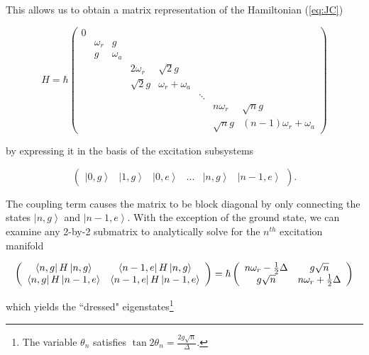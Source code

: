 \documentclass[11 pt, oneside]{book} %
\newcommand{\ket}[1]{\left| #1 \right>} %
\newcommand{\matrixel}[3]{\left< #1 \vphantom{#2#3} \right|
 #2 \left| #3 \vphantom{#1#2} \right>} %
\begin{document}
This allows us to obtain a matrix representation of the Hamiltonian (\ref{eq:JC}) 

\begin{equation}\label{eq:Matrix}
H =  \hbar\left(\begin{array}{cccccccc}
0 \\
& \omega_r 	& g \\
& g    		& \omega_a \\
&&&2\omega_r	 & \sqrt{2}g \\
&&&\sqrt{2}g 		& \omega_r + \omega_a\\
&&&&&\ddots\\
&&&&&&n\omega_r & \sqrt{n}g\\
&&&&&&\sqrt{n}g    & (n-1)\omega_r+\omega_a
\end{array} \right)
\end{equation}

by expressing it in the basis of the excitation subsystems

\begin{equation}
\left(\begin{array}{cccccc} \ket{0,g} & \ket{1,g} & \ket{0,e} & ... & \ket{n, g} & \ket{n-1,e}
\end{array}\right).
\end{equation}

The coupling term causes the matrix to be block diagonal by only connecting the states $\ket{n,g}$ and $\ket{n-1,e}$. With the exception of the ground state, we can examine any 2-by-2 submatrix to analytically solve for the $n^{th}$ excitation manifold

\begin{equation}
\left(\begin{array}{cc}
\matrixel{n,g}{H}{n,g} & \matrixel{n-1,e}{H}{n,g} \\
\matrixel{n,g}{H}{n-1,e} & \matrixel{n-1,e}{H}{n-1,e}
\end{array}\right) = \hbar \left(\begin{array}{cc}
n\omega_r-\frac{1}{2}\Delta 	& g\sqrt{n} \\
 g\sqrt{n}					& n\omega_r+\frac{1}{2}\Delta
\end{array}\right)
\end{equation}

which yields the ``dressed" eigenstates\footnote{The variable $\theta_n$ satisfies $\tan{2\theta_n}=\frac{2g\sqrt{n}}{\Delta}$.} 
\end{document}
